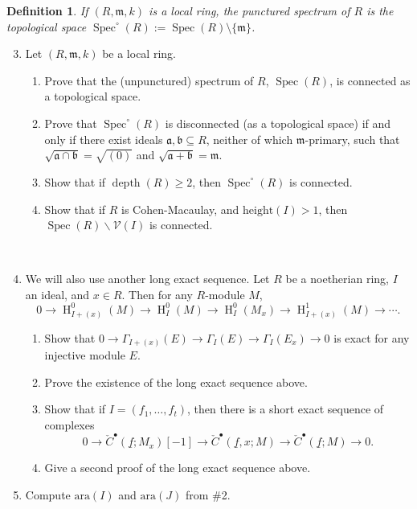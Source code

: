 \documentclass[11pt]{book}
\newtheorem{definition}[theorem]{Definition}
\numberwithin{equation}{section}
\numberwithin{theorem}{chapter}
\theoremstyle{definition}
\newtheorem*{basic properties}{Basic Properties}
\newtheorem*{Important Remark}{Important Remark}
\theoremstyle{remark}
\newcommand{\m}{\mathfrak{m}}
\newcommand{\V}{\mathcal{V}}
\renewcommand{\aa}{\mathfrak{a}}
\newcommand{\bb}{\mathfrak{b}}
\newcommand{\Spec}{\operatorname{Spec}}
\newcommand{\depth}{\operatorname{depth}}
\renewcommand{\H}{\operatorname{H}}
\begin{document}
\begin{definition} If $(R,\m,k)$ is a local ring, the \emph{punctured spectrum}\index{$\Spec^{\circ}(R)$} of $R$ is the topological space $\Spec^{\circ}(R):=\Spec(R) \setminus \{\m\}$.
\end{definition}


\begin{enumerate}\setcounter{enumi}{2}
\item Let $(R,\m,k)$ be a local ring.



\begin{enumerate}
	\item Prove that the (unpunctured) spectrum of $R$, $\Spec(R)$, is connected as a topological space.

\item Prove that $\Spec^{\circ}(R)$ is disconnected (as a topological space) if and only if there exist ideals $\aa,\bb\subseteq R$, neither of which $\m$-primary, such that $\sqrt{\aa \cap \bb}=\sqrt{(0)}$ and $\sqrt{\aa + \bb} = \m$.


\item Show that if $\depth(R)\geq 2$, then $\Spec^{\circ}(R)$ is connected.

\item Show that if $R$ is Cohen-Macaulay, and $\mathrm{height}(I)>1$, then $\Spec(R) \smallsetminus \V(I)$ is connected.

\end{enumerate}

\

\item We will also use another long exact sequence. Let $R$ be a noetherian ring, $I$ an ideal, and $x\in R$. Then for any $R$-module $M$, 
\[ 0\to \H^0_{I+(x)}(M)\to \H^0_I(M)\to \H^0_{I}(M_x)\to \H^1_{I+(x)}(M) \to \cdots. \]



\begin{enumerate}
	\item Show that $0 \to \Gamma_{I+(x)}(E) \to \Gamma_I(E) \to \Gamma_I(E_x) \to 0$ is exact for any injective module $E$.
	

	
	\item Prove the existence of the long exact sequence above.
	
	
	
	\item Show that if $I=(f_1,\dots,f_t)$, then there is a short exact sequence of complexes 
	\[0 \to \check{C}^{\bullet}(\underline{f};M_x)[-1] \to \check{C}^{\bullet}(\underline{f},x;M) \to \check{C}^{\bullet}(\underline{f};M) \to 0.  \]
	
	
	
	\item Give a second proof of the long exact sequence above.
	
	
\end{enumerate}

\item Compute $\mathrm{ara}(I)$ and $\mathrm{ara}(J)$ from \#2.


\end{enumerate}
\end{document}
